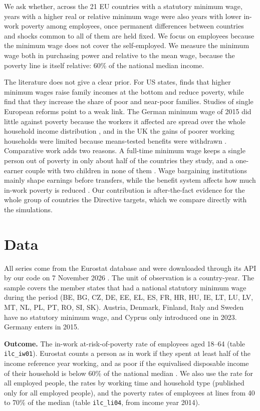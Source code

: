 \documentclass[10pt,a4paper]{article}
\begin{document}
We ask whether, across the 21 EU countries with a statutory minimum wage, years with a higher real or relative minimum wage were also years with lower in-work poverty among employees, once permanent differences between countries and shocks common to all of them are held fixed. We focus on employees because the minimum wage does not cover the self-employed. We measure the minimum wage both in purchasing power and relative to the mean wage, because the poverty line is itself relative: 60\% of the national median income.

The literature does not give a clear prior. For US states, \citet{dube2019} finds that higher minimum wages raise family incomes at the bottom and reduce poverty, while \citet{neumark2005} find that they increase the share of poor and near-poor families. Studies of single European reforms point to a weak link. The German minimum wage of 2015 did little against poverty because the workers it affected are spread over the whole household income distribution \citep{backhaus2023}, and in the UK the gains of poorer working households were limited because means-tested benefits were withdrawn \citep{giupponi2024}. Comparative work adds two reasons. A full-time minimum wage keeps a single person out of poverty in only about half of the countries they study, and a one-earner couple with two children in none of them \citep{marx2012}. Wage bargaining institutions mainly shape earnings before transfers, while the benefit system affects how much in-work poverty is reduced \citep{lohmann2009}. Our contribution is after-the-fact evidence for the whole group of countries the Directive targets, which we compare directly with the simulations.

\section{Data}

All series come from the Eurostat database and were downloaded through its API by our code on 7 November 2026 \citep{eurostat2026}. The unit of observation is a country-year. The sample covers the \NCountries{} member states that had a national statutory minimum wage during the period (BE, BG, CZ, DE, EE, EL, ES, FR, HR, HU, IE, LT, LU, LV, MT, NL, PL, PT, RO, SI, SK). Austria, Denmark, Finland, Italy and Sweden have no statutory minimum wage, and Cyprus only introduced one in 2023. Germany enters in 2015.

\textbf{Outcome.} The in-work at-risk-of-poverty rate of employees aged 18--64 (table \texttt{ilc\_iw01}). Eurostat counts a person as in work if they spent at least half of the income reference year working, and as poor if the equivalised disposable income of their household is below 60\% of the national median \citep{eurostat_iw}. We also use the rate for all employed people, the rates by working time and household type (published only for all employed people), and the poverty rates of employees at lines from 40 to 70\% of the median (table \texttt{ilc\_li04}, from income year 2014).
\end{document}

